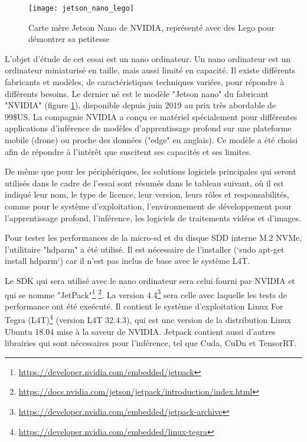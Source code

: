 ﻿
\begin{figure}[H]
    \centering
    \texttt{[image: jetson\_nano\_lego]}
    \caption[Carte mère Jetson Nano de NVIDIA]{Carte mère Jetson Nano de NVIDIA, représenté avec des Lego pour démontrer sa petitesse}
    \label{fig:jetson_nano_lego}
\end{figure}
\par L'objet d'étude de cet essai est un nano ordinateur. Un nano ordinateur est un ordinateur miniaturisé en taille, mais aussi limité en capacité. Il existe différents fabricants et modèles, de caractéristiques techniques variées, pour répondre à différents besoins. Le dernier né est le modèle "Jetson nano" du fabricant "NVIDIA" (figure \ref{fig:jetson_nano_lego}), disponible depuis juin 2019 au prix très abordable de 99\$US. La compagnie NVIDIA a conçu ce matériel spécialement pour différentes applications d'inférence de modèles d'apprentissage profond sur une plateforme mobile (drone) ou proche des données ("edge" en anglais). Ce modèle a été choisi afin de répondre à l'intérêt que suscitent ses capacités et ses limites. 
\par De même que pour les périphériques, les solutions logiciels principales qui seront utilisés dans le cadre de l'essai sont résumés dans le tableau suivant, où il est indiqué leur nom, le type de licence, leur version, leurs rôles et responsabilités, comme pour le système d'exploitation, l'environnement de développement pour l'apprentissage profond, l'inférence, les logiciels de traitements vidéos et d'images. 
\par Pour tester les performances de la micro-sd et du disque SDD interne M.2 NVMe, l'utilitaire "hdparm" a été utilisé. Il est nécessaire de l'installer (`sudo apt-get install hdparm`) car il n'est pas inclus de base avec le système L4T.
\par Le SDK qui sera utilisé avec le nano ordinateur sera celui fourni par NVIDIA et qui se nomme "JetPack"\footnote{\url{https://developer.nvidia.com/embedded/jetpack}} \footnote{\url{https://docs.nvidia.com/jetson/jetpack/introduction/index.html}}. La version 4.4\footnote{\url{https://developer.nvidia.com/embedded/jetpack-archive}} sera celle avec laquelle les tests de performance ont été exeécuté. Il contient le système d'exploitation Linux For Tegra (L4T)\footnote{\url{https://developer.nvidia.com/embedded/linux-tegra}} (version L4T 32.4.3), qui est une version de la distribution Linux Ubuntu 18.04 mise à la saveur de NVIDIA. Jetpack contient aussi d'autres librairies qui sont nécessaires pour l'inférence, tel que Cuda, CuDn et TensorRT.

